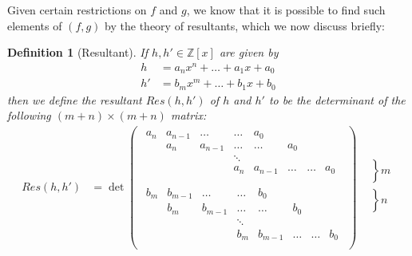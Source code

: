 \documentclass[11pt]{report}
\newtheorem{definition}{Definition}
\newcommand{\Zx}{\mathbb{Z}[x]}
\begin{document}
Given certain restrictions on $f$ and $g$, we know that it is possible to find such elements of $(f,g)$ by the theory of resultants, which we now discuss briefly:

\begin{definition}[Resultant]
If $h,h'\in \Zx$ are given by
\begin{align*}
h &= a_nx^n+\ldots+a_1x+a_0\\
h' &= b_mx^m+\ldots+b_1x+b_0
\end{align*}
then we define the \emph{resultant} $Res(h,h')$ of $h$ and $h'$ to be the determinant of the following $(m+n)\times (m+n)$ matrix:
\begin{align*}
Res(h,h') &= \det\left(\begin{array}{c}\begin{array}{cccccccccc|}
			a_n & a_{n-1} & \ldots & \ldots & a_0 \\
			\ & a_n & a_{n-1} & \ldots & \ldots & a_0 \\
			\ & \ & \ & \ddots \\
			\ & \ & \ & a_n & a_{n-1} & \ldots & \ldots & a_0 \\
			\end{array}\\
			\begin{array}{cccccccc}
			b_m & b_{m-1} & \ldots & \ldots & b_0 \\
			\ & b_m & b_{m-1} & \ldots & \ldots & b_0 \\
			\ & \ & \ & \ddots \\
			\ & \ & \ & b_m & b_{m-1} & \ldots & \ldots & b_0 \\
		   \end{array}\end{array}\right)
		   \begin{array}{c}
		   \left.\begin{array}{cccc}
	            \\ \\ \\ \\
		   \end{array}\right\}m \\
		   \left.\begin{array}{cccc}
		   \\ \\ \\ \\
		   \end{array}\right\}n \\
		   \end{array}
\end{align*}
\end{definition}
\end{document}

